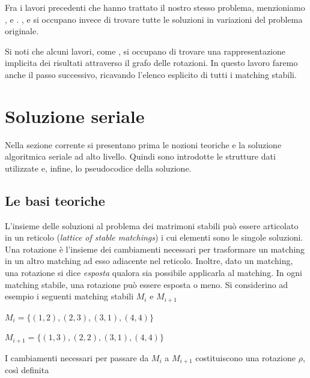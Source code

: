 \documentclass[12pt]{article}
\begin{document}
    Fra i lavori precedenti che hanno trattato il nostro stesso problema, menzioniamo \cite{McVitie1971}, \cite{ThreeProcedures1971} e \cite{Gusfield3FastAlg}. \cite{DIAS2003391}, \cite{EirinakisEtAl2012} e \cite{gutin2023finding} si occupano invece di trovare tutte le soluzioni in variazioni del problema originale.

    Si noti che alcuni lavori, come \cite{cai2019representing}, si occupano di trovare una rappresentazione implicita dei risultati attraverso il grafo delle rotazioni. In questo lavoro faremo anche il passo successivo, ricavando l'elenco esplicito di tutti i matching stabili.
        
\pagebreak

\section{Soluzione seriale}

    Nella sezione corrente si presentano prima le nozioni teoriche e la soluzione algoritmica seriale ad alto livello. Quindi sono introdotte le strutture dati utilizzate e, infine, lo pseudocodice della soluzione.
    
    \subsection{Le basi teoriche}
    L'insieme delle soluzioni al problema dei matrimoni stabili può essere articolato in un reticolo (\textit{lattice of stable matchings}) i cui elementi sono le singole soluzioni.\cite{LatticeOfStableMatchings} Una rotazione è l'insieme dei cambiamenti necessari per trasformare un matching in un altro matching ad esso adiacente nel reticolo. Inoltre, dato un matching, una rotazione si dice \textit{esposta} qualora sia possibile applicarla al matching. In ogni matching stabile, una rotazione può essere esposta o meno. Si considerino ad esempio i seguenti matching stabili $M_i$ e $M_{i+1}$

    \begin{center}
        $M_i = \bigg\{ (1, 2), (2, 3), (3, 1), (4, 4) \bigg\}$
        \hspace{10pt}
        \begin{center}
        $M_{i+1} = \bigg\{ (1, 3), (2, 2), (3, 1), (4, 4) \bigg\}$
        \end{center}    
    \end{center}

    I cambiamenti necessari per passare da $M_i$ a $M_{i+1}$ costituiscono una rotazione $\rho$, così definita  
    
\end{document}
